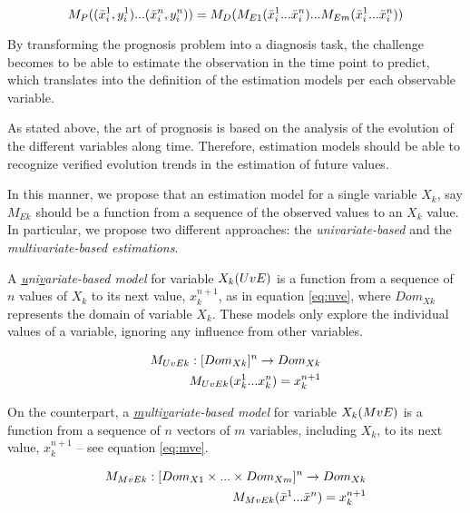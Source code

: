 \begin{equation}
	M_P ((\bar{x}_i^1,y_i^1 )\space...\space(\bar{x}_i^n,y_i^n )) = M_D (M_{E1} (\bar{x}_i^1 \space...\space \bar{x}_i^n ) \space...\space M_{Em}
	(\bar{x}_i^1 \space...\space \bar{x}_i^n ))
\label{eq:prognosis}
\end{equation}

By transforming the prognosis problem into a diagnosis task, the challenge becomes to be able to estimate the observation in the
 time point to predict, which translates into the definition of the estimation models per each observable variable.

As stated above, the art of prognosis is based on the analysis of the evolution of the different variables along time. Therefore,
 estimation models should be able to recognize verified evolution trends in the estimation of future values. 

In this manner, we propose that an estimation model for a single variable $X_k$, say $M_{Ek}$ should be a function from a sequence of the
 observed values to an $X_k$ value. In particular, we propose two different approaches: the \emph{univariate-based} and 
 the \emph{multivariate-based estimations}.

A \emph{\underline{u}ni\underline{v}ariate-based model} for variable $X_k\space(UvE)$ is a function from a sequence of $n$
 values of $X_k$ to its next value, $x_k^{n+1}$, as in equation \ref{eq:uve}, where $Dom_{Xk}$ represents the domain of variable $X_k$. These models only explore the individual values of a variable, ignoring any influence from other variables.

\begin{align} \label{eq:uve}
M_{UvEk}:[Dom_{Xk}]^n \rightarrow Dom_{Xk} \nonumber \\
M_{UvEk}(x_k^1 \space...\space x_k^n) = x_k^{n+1}
\end{align}


On the counterpart, a \emph{\underline{m}ulti\underline{v}ariate-based model} for variable $X_k \space (MvE)$ is a function from a sequence 
of $n$ vectors of $m$ variables, including $X_k$, to its next value, $x_k^{n+1}$ – see equation \ref{eq:mve}.

\begin{align} \label{eq:mve}
M_{MvEk}:[Dom_{X1} \times ... \times Dom_{Xm}]^n \rightarrow Dom_{Xk} \nonumber \\
M_{MvEk}(\bar{x}^1 \space...\space \bar{x}^n) = x_k^{n+1}
\end{align}

